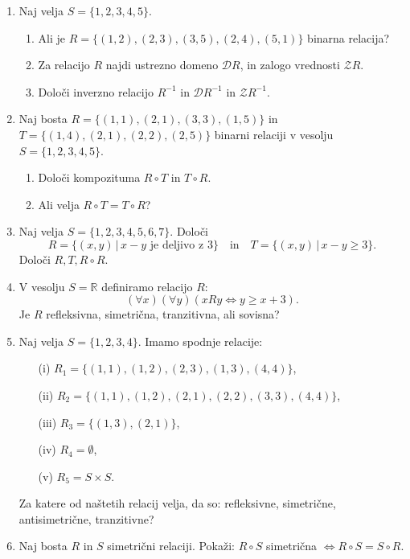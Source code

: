 \documentclass[11pt,paper=b5,footinclude,headinclude]{scrbook} %
\begin{document}
\begin{enumerate}


\item Naj velja $S=\{1,2,3,4,5\}$. 
\begin{enumerate}
    \item Ali je  $R=\{(1,2),(2,3), (3,5), (2,4), (5,1)\}$ binarna relacija?
    \item Za relacijo $R$ najdi ustrezno domeno $\mathcal{D} R$, in zalogo vrednosti $\mathcal{Z} R$.
    \item 
  Določi inverzno relacijo $R^{-1}$ in  $\mathcal{D} R^{-1}$ in  $\mathcal{Z} R^{-1}$.
\end{enumerate}

\item Naj bosta $R=\{(1,1),(2,1), (3,3), (1,5)\}$  in $T=\{(1,4),(2,1), (2,2), (2,5)\}$ binarni relaciji v vesolju $S=\{1,2,3,4,5\}$. \begin{enumerate}
    \item 
Določi kompozituma  $R\circ T$ in $T\circ R$. 
\item Ali velja $R\circ T = T \circ R$?
\end{enumerate}

\item Naj velja  $S=\{1,2,3,4,5,6,7\}$. Določi
$$R= \{(x,y)\,|\, x-y \text{ je deljivo z  }  3\} \quad \mathrm{ in } \quad  T= \{(x,y)\,|\, x-y \geq 3\}.$$
Določi $R,T, R\circ R$.


\item V vesolju  $S= \mathbb{R}$  definiramo  relacijo $R$:
$$(\forall x)(\forall y)(x R y \Leftrightarrow y \geq x +3).$$
Je $R$ refleksivna, simetrična, tranzitivna, ali sovisna?

\item Naj velja  $S=\{1,2,3,4\}$. Imamo spodnje relacije:
\begin{enumerate}
\item[(i)] $R_1= \{(1,1),(1,2),(2,3), (1,3), (4,4)\}$,
\item[(ii)] $R_2= \{(1,1),(1,2),(2,1), (2,2), (3,3), (4,4)\}$,
\item[(iii)] $R_3= \{(1,3),(2,1)\}$,
\item[(iv)] $R_4= \emptyset$,
\item[(v)] $R_5= S\times S$.
\end{enumerate}
Za katere od naštetih relacij velja, da so: refleksivne, simetrične, antisimetrične, tranzitivne? 

\item Naj bosta $R$ in $S$ simetrični relaciji. Pokaži: $R\circ S$ simetrična $\Leftrightarrow R\circ S = S \circ R$.



\end{enumerate}
\end{document}
